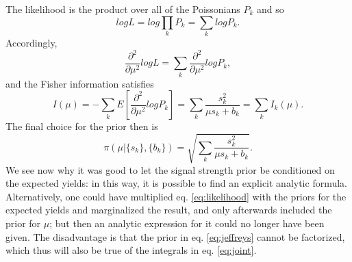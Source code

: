 \documentclass[aps,prb,twocolumn,showpacs,superscriptaddress,groupedaddress]{revtex4}  %
\begin{document}
The likelihood is the product over all of the Poissonians $P_{k}$ and so
\begin{equation*}
log L=log \prod\limits_{k}P_{k}=\sum\limits_{k}log P_{k}.
\end{equation*}
Accordingly,
\begin{equation*}
\frac{\partial^{2}}{\partial\mu^{2}}log L=\sum\limits_{k}\frac{\partial^{2}}{\partial\mu^{2}}log P_{k},
\end{equation*}
and the Fisher information  satisfies
\begin{equation*}
I(\mu)=-\sum\limits_{k}E[\frac{\partial^{2}}{\partial\mu^{2}}log P_{k}]=\sum\limits_{k}\frac{s_{k}^{2}}{\mu s_{k}+b_{k}}=\sum\limits_{k}I_{k}(\mu).
\end{equation*}
The final choice for the prior then is
\begin{equation}\label{eq:jeffreys}
\pi(\mu|\{s_{k}\},\{b_{k}\})=\sqrt{\sum\limits_{k}\frac{s_{k}^{2}}{\mu s_{k}+b_{k}}}.
\end{equation}
We see now why it was good to let the signal strength prior be conditioned on the expected yields: in this way, it is possible to find an explicit analytic formula. Alternatively, one could have multiplied eq. \ref{eq:likelihood} with the priors for the expected yields and marginalized the result, and only afterwards included the prior for $\mu$; but then an analytic expression for it could no longer have been given. The disadvantage is that the prior in eq. \ref{eq:jeffreys} cannot be factorized, which thus will also be true of the integrals in eq. \ref{eq:joint}.
\end{document}
